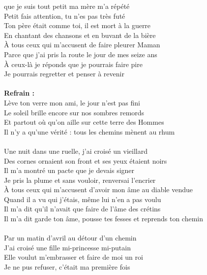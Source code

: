 
 que je suis tout petit ma mère m'a répété
\\Petit fais attention, tu n'es pas très futé
\\Ton père était comme toi, il est mort à la guerre
\\En chantant des chansons et en buvant de la bière
\\À tous ceux qui m'accusent de faire pleurer Maman
\\Parce que j'ai pris la route le jour de mes seize ans
\\À ceux-là je réponds que je pourrais faire pire
\\Je pourrais regretter et penser à revenir
\\\\\textbf{Refrain :}
\\Lève ton verre mon ami, le jour n'est pas fini
\\Le soleil brille encore sur nos sombres remords
\\Et partout où qu'on aille sur cette terre des Hommes
\\Il n'y a qu'une vérité : tous les chemins mènent au rhum
\\\\Une nuit dans une ruelle, j'ai croisé un vieillard
\\Des cornes ornaient son front et ses yeux étaient noirs
\\Il m'a montré un pacte que je devais signer
\\Je pris la plume et sans vouloir, renversai l'encrier
\\À tous ceux qui m'accusent d'avoir mon âme au diable vendue
\\Quand il a vu qui j'étais, même lui n'en a pas voulu
\\Il m'a dit qu'il n'avait que faire de l'âme des crétins
\\Il m'a dit garde ton âme, pousse tes fesses et reprends ton chemin
\\\\Par un matin d'avril au détour d'un chemin
\\J'ai croisé une fille mi-princesse mi-putain
\\Elle voulut m'embrasser et faire de moi un roi
\\Je ne pus refuser, c'était ma première fois
